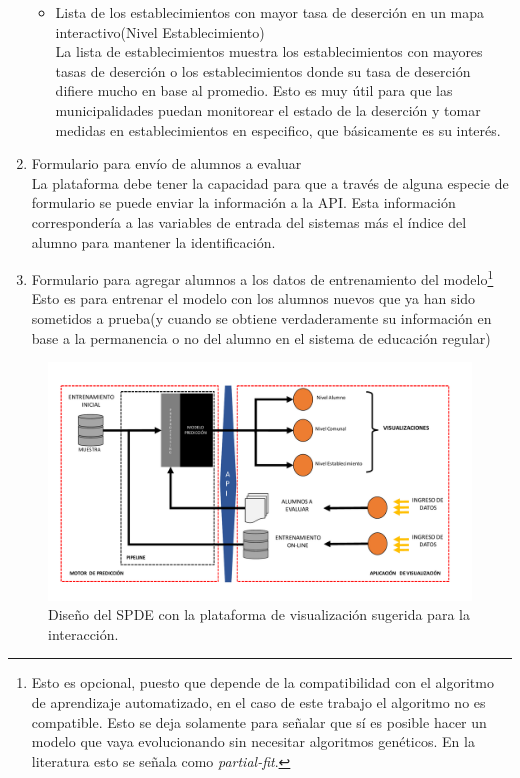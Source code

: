 \begin{enumerate}
\begin{itemize}
    \item Lista de los establecimientos con mayor tasa de deserción en un mapa interactivo(Nivel Establecimiento) \\ \hfill
    La lista de establecimientos muestra los establecimientos con mayores tasas de deserción o los establecimientos donde su tasa de deserción difiere mucho en base al promedio. Esto es muy útil para que las municipalidades puedan monitorear el estado de la deserción y tomar medidas en establecimientos en especifico, que básicamente es su interés.
    \end{itemize}
\item Formulario para envío de alumnos a evaluar \\ \hfill
La plataforma debe tener la capacidad para que a través de alguna especie de formulario se puede enviar la información a la API. Esta información correspondería a las variables de entrada del sistemas más el índice del alumno para mantener la identificación.
\item Formulario para agregar alumnos a los datos de entrenamiento del modelo\footnote{Esto es opcional, puesto que depende de la compatibilidad con el algoritmo de aprendizaje automatizado, en el caso de este trabajo el algoritmo no es compatible. Esto se deja solamente para señalar que sí es posible hacer un modelo que vaya evolucionando sin necesitar algoritmos genéticos. En la literatura esto se señala como \textit{partial-fit}.} \\ \hfill
Esto es para entrenar el modelo con los alumnos nuevos que ya han sido sometidos a prueba(y cuando se obtiene verdaderamente su información en base a la permanencia o no del alumno en el sistema de educación regular)
\end{enumerate}
\begin{figure}[H]
  \centering
    \includegraphics[trim=0cm 0cm 0cm 0cm,scale=0.45]{Figuras/6SolucionPropuesta/Sistema.pdf}
      \caption{Diseño del SPDE con la plataforma de visualización sugerida para la interacción.}
    \label{fig:SPDE}
\end{figure}


